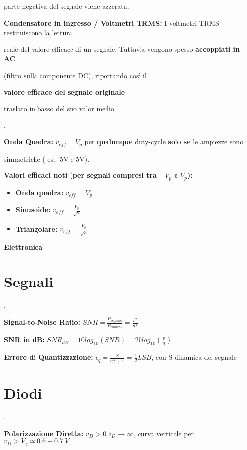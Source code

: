 \documentclass[12pt]{extarticle}
\begin{document}
parte negativa del segnale viene azzerata.
\newpage

{\bf Condensatore in ingresso / Voltmetri TRMS:} I voltmetri TRMS restituiscono la lettura

reale del valore efficace di un segnale. Tuttavia vengono spesso {\bf accoppiati in AC} 

(filtro sulla componente DC), riportando così il {\bf valore efficace del segnale originale

traslato in basso del suo valor medio}.

{\bf Onda Quadra:} $\displaystyle v_{eff} = V_p$ per {\bf qualunque} duty-cycle {\bf solo se} le ampiezze sono 

simmetriche ( es. -5V e 5V).

{\bf Valori efficaci noti (per segnali compresi tra $\displaystyle -V_p$ e $\displaystyle V_p$):} 
\begin{itemize}
    \item {\bf Onda quadra:}  $\displaystyle v_{eff} = V_p$
    \item {\bf Sinusoide:} $\displaystyle v_{eff} = \frac{V_p}{\sqrt{2}}$
    \item {\bf Triangolare:} $\displaystyle v_{eff} = \frac{V_p}{\sqrt{3}}$
\end{itemize}

{\bf \Huge Elettronica}
\setcounter{section}{0}
\section{Segnali}.


{\bf Signal-to-Noise Ratio:} $\displaystyle SNR = \frac{P_{segnale}}{P_{rumore}} = \frac{v^2}{n^2}$ 

{\bf SNR in dB:} $\displaystyle SNR_{dB} = 10log_{10}(SNR) = 20log_{10}(\frac{v}{n})$

{\bf Errore di Quantizzazione:} $\displaystyle \epsilon_q = \frac{S}{2^N+1} = \frac{1}{2}LSB $, con S dinamica del segnale

\section{Diodi}.

{\bf Polarizzazione Diretta:} $\displaystyle v_D > 0, i_D \to \infty $, curva verticale per $v_D > V_\gamma \simeq 0.6-0.7 \ V$
\end{document}
